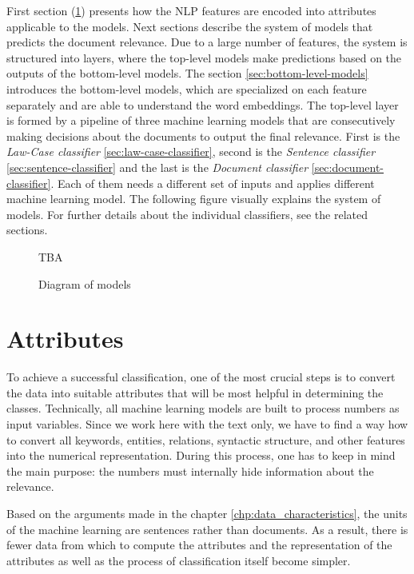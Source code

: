 \documentclass[
  digital, %
  notable,   %
  nolof,     %
  nolot,     %
]{fithesis3}
\begin{document}
First section (\ref{sec:attributes}) presents how the NLP features are encoded into attributes applicable to the models.
Next sections describe the system of models that predicts the document relevance.
Due to a large number of features, the system is structured into layers, where the top-level models make predictions based on the outputs of the bottom-level models.
The section \ref{sec:bottom-level-models} introduces the bottom-level models, which are specialized on each feature separately and are able to understand the word embeddings.
The top-level layer is formed by a pipeline of three machine learning models that are consecutively making decisions about the documents to output the final relevance.
First is the \textit{Law-Case classifier} \ref{sec:law-case-classifier}, second is the \textit{Sentence classifier} \ref{sec:sentence-classifier} and the last is the \textit{Document classifier} \ref{sec:document-classifier}.
Each of them needs a different set of inputs and applies different machine learning model.
The following figure visually explains the system of models.
For further details about the individual classifiers, see the related sections.


\begin{figure}[H]
\caption{Diagram of models}
\label{fig:models-diagram}
TBA
\end{figure}

\section{Attributes}
\label{sec:attributes}
To achieve a successful classification, one of the most crucial steps is to convert the data into suitable attributes that will be most helpful in determining the classes.
Technically, all machine learning models are built to process numbers as input variables.
Since we work here with the text only, we have to find a way how to convert all keywords, entities, relations, syntactic structure, and other features into the numerical representation.
During this process, one has to keep in mind the main purpose: the numbers must internally hide information about the relevance.

Based on the arguments made in the chapter \ref{chp:data_characteristics}, the units of the machine learning are sentences rather than documents.
As a result, there is fewer data from which to compute the attributes and the representation of the attributes as well as the process of classification itself become simpler.
\end{document}
